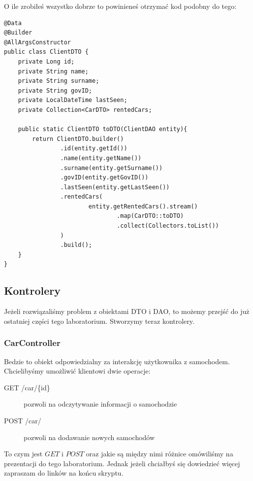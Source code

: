 \documentclass{article}
\begin{document}
                O ile zrobiłeś wszystko dobrze to powinieneś otrzymać kod podobny do tego:
                \begin{verbatim}
@Data
@Builder
@AllArgsConstructor
public class ClientDTO {
    private Long id;
    private String name;
    private String surname;
    private String govID;
    private LocalDateTime lastSeen;
    private Collection<CarDTO> rentedCars;

    public static ClientDTO toDTO(ClientDAO entity){
        return ClientDTO.builder()
                .id(entity.getId())
                .name(entity.getName())
                .surname(entity.getSurname())
                .govID(entity.getGovID())
                .lastSeen(entity.getLastSeen())
                .rentedCars(
                        entity.getRentedCars().stream()
                                .map(CarDTO::toDTO)
                                .collect(Collectors.toList())
                )
                .build();
    }
}
                \end{verbatim}
        \subsection{Kontrolery}
            Jeżeli rozwiązaliśmy problem z obiektami DTO i DAO, to możemy przejść do już ostatniej części tego laboratorium. Stworzymy teraz kontrolery.
            \subsubsection{CarController}
                Bedzie to obiekt odpowiedzialny za interakcję użytkownika z samochodem. Chcielibyśmy umożliwić klientowi dwie operacje:
                \begin{description}
                    \item[GET /car/\{id\}] pozwoli na odczytywanie informacji o samochodzie 
                    \item[POST /car/]  pozwoli na dodawanie nowych samochodów
                \end{description}
                To czym jest $GET$ i $POST$ oraz jakie są między nimi różnice omówiliśmy na prezentacji do tego laboratorium. Jednak jeżeli chciałbyś się dowiedzieć więcej zapraszam do linków na końcu skryptu.
                
\end{document}
